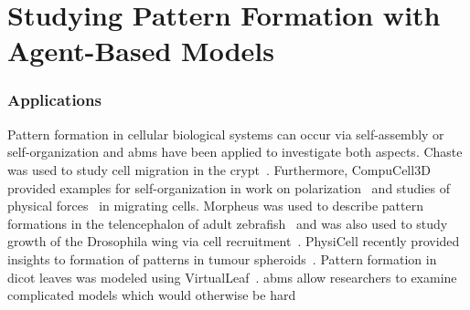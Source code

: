 \section{Studying Pattern Formation with Agent-Based Models}
\label{sec:analysis}
%
%
\subsubsection*{Applications}
\label{subsubsec:abms-comparison-to-pdes}\noindent
Pattern formation in cellular biological systems can occur via self-assembly or
self-organization and \acp{abm} have been applied to investigate both aspects.
%
Chaste was used to study cell migration in the crypt~\cite{Dunn2013}.
Furthermore, CompuCell3D provided examples for self-organization in work on
polarization~\cite{Thomas2022} and studies of physical forces~\cite{Pan2021} in migrating cells.
Morpheus was used to describe pattern formations in the telencephalon of adult
zebrafish~\cite{Lupperger2020} and was also used to study growth of the Drosophila wing
via cell recruitment~\cite{Munoz-nava2020}.
PhysiCell recently provided insights to formation of patterns in tumour
spheroids~\cite{Goncalves2021}.
Pattern formation in dicot leaves was modeled using VirtualLeaf~\cite{Holloway2021}.
%
\acp{abm} allow researchers to examine complicated models which would otherwise be hard
